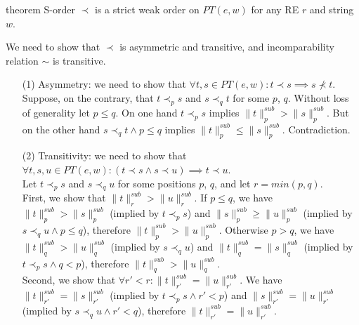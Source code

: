 \documentclass[AMA,STIX1COL]{WileyNJD-v2}
\newcommand{\snorm}[2]{\|{#1}\|^{sub}_{#2}}
\begin{document}
\begin{theoremEnd}[restate, no link to proof, no link to theorem, category=theorem_sorder_on_PTs]{theorem}
    \label{theorem_sorder_on_PTs}
    S-order $\prec$ is a strict weak order on $PT(e, w)$ for any RE $r$ and string $w$.
\end{theoremEnd}
\begin{proofEnd}
    We need to show that $\prec$ is asymmetric and transitive, and incomparability relation $\sim$ is transitive.

    \begin{itemize}[itemsep=0.5em]
        \item[(1)]
            Asymmetry: we need to show that $\forall t, s \in PT(e,w): t \prec s \implies s \not\prec t$.
            \\[0.5em]
            Suppose, on the contrary, that $t \prec_p s$ and $s \prec_q t$ for some $p$, $q$.
            Without loss of generality let $p \leq q$.
            On one hand $t \prec_p s$ implies $\snorm{t}{p} > \snorm{s}{p}$.
            But on the other hand $s \prec_q t \wedge p \leq q$ implies $\snorm{t}{p} \leq \snorm{s}{p}$.
            Contradiction.

        \item[(2)]
            Transitivity: we need to show that $\forall t, s, u \in PT(e,w): (t \prec s \wedge s \prec u) \implies t \prec u$.
            \\[0.5em]
            Let $t \prec_p s$ and $s \prec_q u$ for some positions $p$, $q$, and let $r = min (p, q)$.
            \\[0.5em]
            First, we show that $\snorm{t}{r} > \snorm{u}{r}$.
            If $p \leq q$, we have $\snorm{t}{p} > \snorm{s}{p}$ (implied by $t \prec_p s$)
            and $\snorm{s}{p} \geq \snorm{u}{p}$ (implied by $s \prec_q u \wedge p \leq q$),
            therefore $\snorm{t}{p} > \snorm{u}{p}$.
            Otherwise $p > q$, we have $\snorm{t}{q} > \snorm{u}{q}$ (implied by $s \prec_q u$)
            and $\snorm{t}{q} = \snorm{s}{q}$ (implied by $t \prec_p s \wedge q < p$),
            therefore $\snorm{t}{q} > \snorm{u}{q}$.
            \\[0.5em]
            Second, we show that $\forall r' < r : \snorm{t}{r'} = \snorm{u}{r'}$.
            We have $\snorm{t}{r'} = \snorm{s}{r'}$ (implied by $t \prec_p s \wedge r' < p$)
            and $\snorm{s}{r'} = \snorm{u}{r'}$ (implied by $s \prec_q u \wedge r' < q$),
            therefore $\snorm{t}{r'} = \snorm{u}{r'}$.


\end{itemize}
\end{proofEnd}
\end{document}
